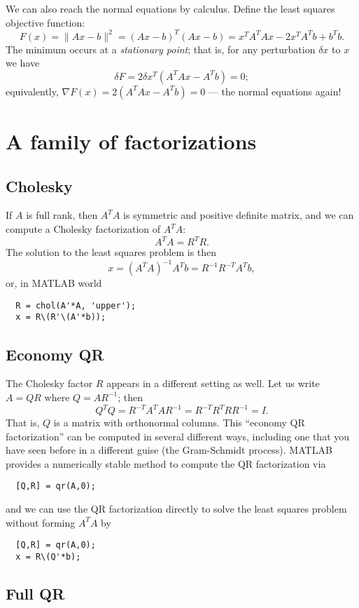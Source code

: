 \documentclass[12pt, leqno]{article}
\begin{document}
We can also reach the normal equations by calculus.  Define
the least squares objective function:
\[
  F(x) = \|Ax-b\|^2 = (Ax-b)^T (Ax-b) = x^T A^TA x - 2x^T A^T b + b^T b.
\]
The minimum occurs at a {\em stationary point}; that is,
for any perturbation $\delta x$ to $x$ we have
\[
  \delta F = 2 \delta x^T (A^T A x - A^T b) = 0;
\]
equivalently, $\nabla F(x) = 2 (A^T A x - A^T b) = 0$ ---
the normal equations again!

\section{A family of factorizations}

\subsection{Cholesky}

If $A$ is full rank, then $A^T A$ is symmetric and positive definite
matrix, and we can compute a Cholesky factorization of $A^T A$:
\[
  A^T A = R^T R.
\]
The solution to the least squares problem is then
\[
  x = (A^T A)^{-1} A^T b = R^{-1} R^{-T} A^T b,
\]
or, in MATLAB world
\begin{lstlisting}
  R = chol(A'*A, 'upper');
  x = R\(R'\(A'*b));
\end{lstlisting}

\subsection{Economy QR}

The Cholesky factor $R$ appears in a different setting as well.
Let us write $A = QR$ where $Q = AR^{-1}$; then
\[
  Q^T Q = R^{-T} A^T A R^{-1} = R^{-T} R^T R R^{-1} = I.
\]
That is, $Q$ is a matrix with orthonormal columns.  This
``economy QR factorization'' can be computed in several different
ways, including one that you have seen before in a different guise
(the Gram-Schmidt process).  MATLAB provides a numerically stable
method to compute the QR factorization via
\begin{lstlisting}
  [Q,R] = qr(A,0);
\end{lstlisting}
and we can use the QR factorization directly to solve the least
squares problem without forming $A^T A$ by
\begin{lstlisting}
  [Q,R] = qr(A,0);
  x = R\(Q'*b);
\end{lstlisting}

\subsection{Full QR}
\end{document}
